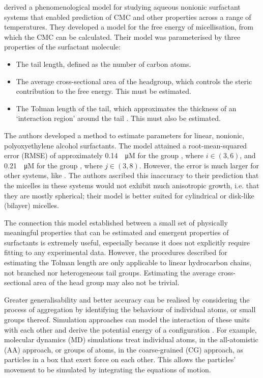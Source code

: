 \citet{puvvadaMolecularThermodynamicApproach1990} derived a phenomenological
model for studying aqueous nonionic surfactant systems that enabled prediction
of CMC and other properties across a range of temperatures. They developed a
model for the free energy of micellisation, from which the CMC can be
calculated. Their model was parameterised by three properties of the surfactant
molecule:
\begin{itemize}
    \item The tail length, defined as the number of carbon atoms.
    \item The average cross-sectional area of the headgroup, which controls the
          steric contribution to the free energy. This must be estimated.
    \item The Tolman length of the tail, which approximates the thickness of an
          `interaction region' around the tail
          \cite{demiguelGibbsThermodynamicsSurface2021}. This must also be
          estimated.
\end{itemize}

The authors developed a method to estimate parameters for linear, nonionic,
polyoxyethylene alcohol surfactants. The model attained a root-mean-squared
error (RMSE) of approximately \SI{0.14}{\log \micro M} for the group
, where $i \in (3, 6)$, and \SI{0.21}{\log \micro M} for the group
, where $j \in (3, 8)$. However, the error is much larger for other
systems, like . The authors ascribed this inaccuracy to their
prediction that the micelles in these systems would not exhibit much anisotropic
growth, i.e. that they are mostly spherical; their model is better suited for
cylindrical or disk-like (bilayer) micelles.

The connection this model established between a small set of physically meaningful properties that can be estimated and emergent properties of surfactants is extremely useful, especially because it does not explicitly require fitting to any experimental data. However, the procedures described for estimating the Tolman length are only applicable to linear hydrocarbon chains, not branched nor heterogeneous tail groups. Estimating the average cross-sectional area of the head group may also not be trivial.

Greater generalisability and better accuracy can be realised by considering the
process of aggregation by identifying the behaviour of individual atoms, or
small groups thereof. Simulation approaches can model the interaction of these
units with each other and derive the potential energy of a configuration
\cite{frenkelUnderstandingMolecularSimulation2001,joshiReviewAdvancementsCoarsegrained2021,filipeMolecularDynamicsSimulations2022}.
For example, molecular dynamics (MD) simulations treat individual atoms, in the
all-atomistic (AA) approach, or groups of atoms, in the coarse-grained (CG)
approach, as particles in a box that exert force on each other. This allows the
particles' movement to be simulated by integrating the equations of motion.

